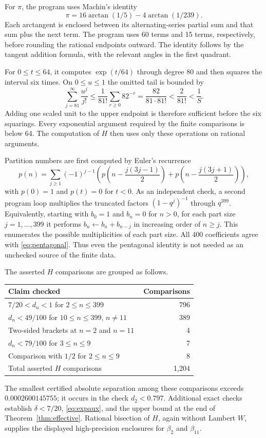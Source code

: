 \documentclass[11pt]{article}
\numberwithin{equation}{section}
\theoremstyle{definition}
\theoremstyle{remark}
\begin{document}
For $\pi$, the program uses Machin's identity
\[
 \pi=16\arctan(1/5)-4\arctan(1/239).
\]
Each arctangent is enclosed between its alternating-series partial sum
and that sum plus the next term. The program uses 60 terms and 15 terms,
respectively, before rounding the rational endpoints outward.
The identity follows by the tangent addition formula, with the relevant
angles in the first quadrant.

For $0\le t\le64$, it computes $\exp(t/64)$ through degree 80 and then
squares the interval six times. On $0\le u\le1$ the omitted tail is
bounded by
\[
 \sum_{j=81}^\infty\frac{u^j}{j!}
 \le\frac1{81!}\sum_{r\ge0}82^{-r}
 =\frac{82}{81\cdot81!}<\frac2{81!}<\frac1S.
\]
Adding one scaled unit to the upper endpoint is therefore sufficient
before the six squarings. Every exponential argument required by the
finite comparisons is below 64. The computation of $H$ then uses only
these operations on rational arguments.

Partition numbers are first computed by Euler's recurrence
\begin{equation}\label{eq:pentagonal}
 p(n)=\sum_{j\ge1}(-1)^{j-1}
 \left(p\!\left(n-\frac{j(3j-1)}2\right)
      +p\!\left(n-\frac{j(3j+1)}2\right)\right),
\end{equation}
with $p(0)=1$ and $p(t)=0$ for $t<0$. As an independent check, a second
program loop multiplies the truncated factors $(1-q^j)^{-1}$ through
$q^{399}$. Equivalently, starting with $b_0=1$ and $b_n=0$ for $n>0$,
for each part size $j=1,\ldots,399$ it performs $b_n\leftarrow b_n+b_{n-j}$
in increasing order of $n\ge j$. This enumerates the possible
multiplicities of each part size. All 400 coefficients agree with
\eqref{eq:pentagonal}. Thus even the pentagonal identity is not needed
as an unchecked source of the finite data.

The asserted $H$ comparisons are grouped as follows.
\begin{center}
\begin{tabular}{@{}p{0.73\linewidth}r@{}}
\toprule
Claim checked & Comparisons\\
\midrule
$7/20<d_n<1$ for $2\le n\le399$ & 796\\
$d_n<49/100$ for $10\le n\le399$, $n\ne11$ & 389\\
Two-sided brackets at $n=2$ and $n=11$ & 4\\
$d_n<79/100$ for $3\le n\le9$ & 7\\
Comparison with $1/2$ for $2\le n\le9$ & 8\\
\midrule
Total asserted $H$ comparisons & 1,204\\
\bottomrule
\end{tabular}
\end{center}
The smallest certified absolute separation among these comparisons
exceeds $0.0002600145755$; it occurs in the check $d_2<0.797$.
Additional exact checks establish $\delta<7/20$,
\eqref{eq:expaux}, and the upper bound at the end of
Theorem~\ref{thm:effective}. Rational bisection of $H$, again without
Lambert $W$, supplies the displayed high-precision enclosures for
$\beta_2$ and $\beta_{11}$.
\end{document}
